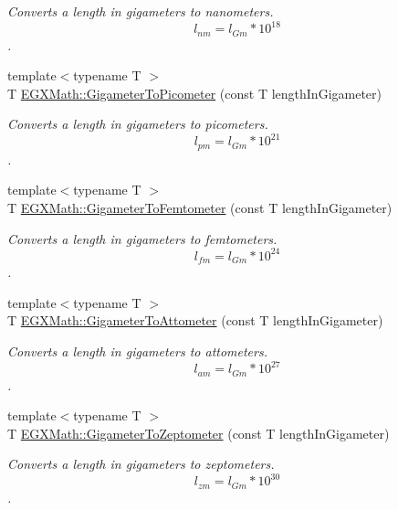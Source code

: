 \begin{DoxyCompactItemize}
\begin{DoxyCompactList}\small\item\em Converts a length in gigameters to nanometers. \[ l_{nm}=l_{Gm} * 10^{18} \]. \end{DoxyCompactList}\item 
{\footnotesize template$<$typename T $>$ }\\T \mbox{\hyperlink{group___e_g_x_math-_conversions-_length_conversions-_s_i-_gigameter-_s_i_gae9cea35a0ce747d02ec8b6cf7bfeaa7e}{E\+G\+X\+Math\+::\+Gigameter\+To\+Picometer}} (const T length\+In\+Gigameter)
\begin{DoxyCompactList}\small\item\em Converts a length in gigameters to picometers. \[ l_{pm}=l_{Gm} * 10^{21} \]. \end{DoxyCompactList}\item 
{\footnotesize template$<$typename T $>$ }\\T \mbox{\hyperlink{group___e_g_x_math-_conversions-_length_conversions-_s_i-_gigameter-_s_i_ga6701fe7aa809ca67fef5d4f9bf7b241c}{E\+G\+X\+Math\+::\+Gigameter\+To\+Femtometer}} (const T length\+In\+Gigameter)
\begin{DoxyCompactList}\small\item\em Converts a length in gigameters to femtometers. \[ l_{fm}=l_{Gm} * 10^{24} \]. \end{DoxyCompactList}\item 
{\footnotesize template$<$typename T $>$ }\\T \mbox{\hyperlink{group___e_g_x_math-_conversions-_length_conversions-_s_i-_gigameter-_s_i_ga43e0ac7c59e4df08c27ed864c64e6008}{E\+G\+X\+Math\+::\+Gigameter\+To\+Attometer}} (const T length\+In\+Gigameter)
\begin{DoxyCompactList}\small\item\em Converts a length in gigameters to attometers. \[ l_{am}=l_{Gm} * 10^{27} \]. \end{DoxyCompactList}\item 
{\footnotesize template$<$typename T $>$ }\\T \mbox{\hyperlink{group___e_g_x_math-_conversions-_length_conversions-_s_i-_gigameter-_s_i_ga5013069156df55018bc5a7f57f236f08}{E\+G\+X\+Math\+::\+Gigameter\+To\+Zeptometer}} (const T length\+In\+Gigameter)
\begin{DoxyCompactList}\small\item\em Converts a length in gigameters to zeptometers. \[ l_{zm}=l_{Gm} * 10^{30} \]. \end{DoxyCompactList}\item 

\end{DoxyCompactItemize}
